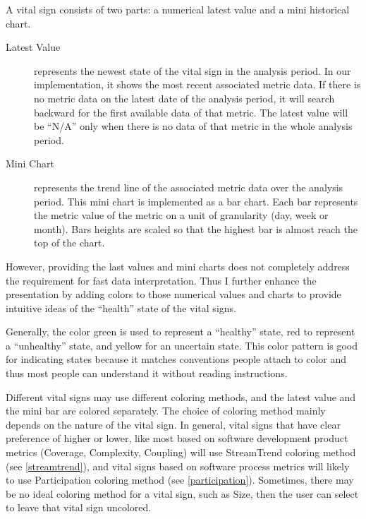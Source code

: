 A vital sign consists of two parts: a numerical latest value and a mini historical chart. 
\begin{description}
\item[Latest Value] represents the newest state of the vital sign in the analysis period. In our implementation, it shows the most recent associated metric data. If there is no metric data on the latest date of the analysis period, it will search backward for the first available data of that metric. The latest value will be ``N/A'' only when there is no data of that metric in the whole analysis period.
\item[Mini Chart] represents the trend line of the associated metric data over the analysis period. This mini chart is implemented as a bar chart. Each bar represents the metric value of the metric on a unit of granularity (day, week or month). Bars heights are scaled so that the highest bar is almost reach the top of the chart.
\end{description}

However, providing the last values and mini charts does not completely address the requirement for fast data interpretation. Thus I further enhance the presentation by adding colors to those numerical values and charts to provide intuitive ideas of the ``health'' state of the vital signs.

Generally, the color green is used to represent a ``healthy'' state, red to represent a ``unhealthy'' state, and yellow for an uncertain state. This color pattern is good for indicating states because it matches conventions people attach to color and thus most people can understand it without reading instructions.

Different vital signs may use different coloring methods, and the latest value and the mini bar are colored separately. The choice of coloring method mainly depends on the nature of the vital sign. In general, vital signs that have clear preference of higher or lower, like most based on software development product metrics (Coverage, Complexity, Coupling) will use StreamTrend coloring method (see \autoref{streamtrend}), and vital signs based on software process metrics will likely to use Participation coloring method (see \autoref{participation}). Sometimes, there may be no ideal coloring method for a vital sign, such as Size, then the user can select to leave that vital sign uncolored.

